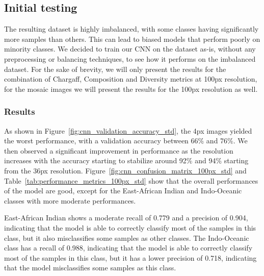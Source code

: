 \subsection{Initial testing}
\label{subsec:initial_testing}

The resulting dataset is highly imbalanced, with some classes having significantly more samples than others. This can lead to biased models
that perform poorly on minority classes. We decided to train our CNN on the dataset as-is, without any preprocessing or balancing techniques,
to see how it performs on the imbalanced dataset. For the sake of brevity, we will only present the results for the combination of Chargaff,
Composition and Diversity metrics at 100px resolution, for the mosaic images we will present the results for the 100px resolution as well.

\subsubsection{Results}
\label{subsubsec:results_initial_testing}

As shown in Figure~\ref{fig:cnn_validation_accuracy_std}, the 4px images yielded the worst performance, with a validation accuracy between 66\%
and 76\%. We then observed a significant improvement in performance as the resolution increases with the accuracy starting to stabilize
around 92\% and 94\% starting from the 36px resolution. Figure~\ref{fig:cnn_confusion_matrix_100px_std} and Table~\ref{tab:performance_metrics_100px_std}
show that the overall performances of the model are good, except for the East-African Indian and Indo-Oceanic classes with more moderate performances.

East-African Indian shows a moderate recall of 0.779 and a precision of 0.904, indicating that the model is able to correctly classify
most of the samples in this class, but it also misclassifies some samples as other classes. The Indo-Oceanic class has a recall of 0.988,
indicating that the model is able to correctly classify most of the samples in this class, but it has a lower precision of 0.718, indicating
that the model misclassifies some samples as this class.

